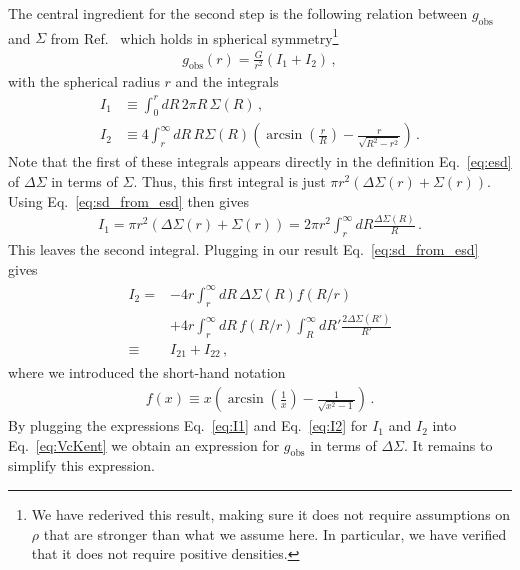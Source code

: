 \documentclass[a4paper,11pt]{article}
\begin{document}
The central ingredient for the second step is the following relation between $g_{\mathrm{obs}}$ and $\Sigma$ from Ref.~\cite{Kent1986} which holds in spherical symmetry\footnote{
  We have rederived this result, making sure it does not require assumptions on $\rho$ that are stronger than what we assume here.
  In particular, we have verified that it does not require positive densities.
}
\begin{align}
 \label{eq:VcKent}
 g_{\mathrm{obs}}(r) =  \frac{G}{r^2} \left(I_1 + I_2\right) \,,
\end{align}
with the spherical radius $r$ and the integrals
\begin{align}
 I_1 &\equiv \int_0^r dR \, 2\pi R \, \Sigma(R) \,, \\
 I_2 &\equiv 4 \int_r^{\infty} dR\, R \Sigma(R) \left(\arcsin\left(\frac{r}{R}\right) - \frac{r}{\sqrt{R^2-r^2}}\right) \,.
\end{align}
Note that the first of these integrals appears directly in the definition Eq.~\eqref{eq:esd} of $\Delta \Sigma$ in terms of $\Sigma$.
Thus, this first integral is just $\pi r^2(\Delta \Sigma(r) + \Sigma(r))$.
Using Eq.~\eqref{eq:sd_from_esd} then gives
\begin{align}
 \label{eq:I1}
 I_1 = \pi r^2 ( \Delta \Sigma(r) + \Sigma(r) ) = 2 \pi r^2 \int_r^\infty dR \frac{\Delta \Sigma(R)}{R} \,.
\end{align}
This leaves the second integral.
Plugging in our result Eq.~\eqref{eq:sd_from_esd} gives
\begin{align}
\label{eq:I2}
\begin{split}
    I_2 =
      &-4 r \int_r^{\infty} dR\, \Delta\Sigma(R) f(R/r)  \\
      &+4 r \int_r^{\infty} dR\, f(R/r) \int_R^\infty dR' \frac{2 \Delta \Sigma(R')}{R'} \\
      \equiv &I_{21} + I_{22} \,,
\end{split}
\end{align}
where we introduced the short-hand notation
\begin{align}
 f(x) \equiv x \left( \arcsin\left(\frac{1}{x}\right) - \frac{1}{\sqrt{x^2-1}} \right) \,.
\end{align}
By plugging the expressions Eq.~\eqref{eq:I1} and Eq.~\eqref{eq:I2} for $I_1$ and $I_2$ into Eq.~\eqref{eq:VcKent} we obtain an expression for $g_{\mathrm{obs}}$ in terms of $\Delta \Sigma$.
It remains to simplify this expression.
\end{document}
